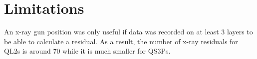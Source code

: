 
\section{Limitations}
An x-ray gun position was only useful if data was recorded on at least 3 layers to be able to calculate a residual. As a result, the number of x-ray residuals for QL2s is around 70 while it is much smaller for QS3Ps.

